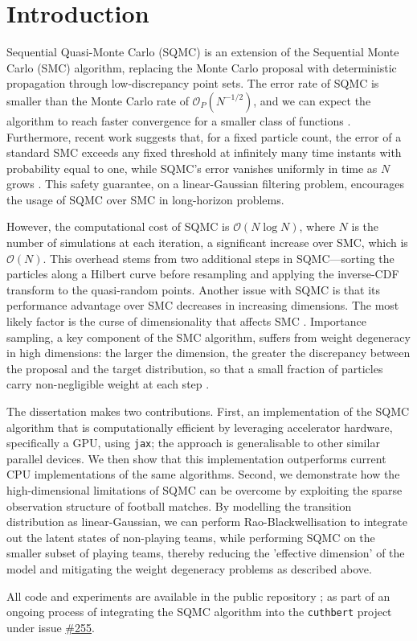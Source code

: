 \chapter{Introduction}

Sequential Quasi-Monte Carlo (SQMC) is an extension of the Sequential Monte Carlo (SMC) algorithm, replacing the Monte Carlo proposal with deterministic propagation through low-discrepancy point sets. The error rate of SQMC is smaller than the Monte Carlo rate of $\mathcal{O}_P (N^{-1/2})$, and we can expect the algorithm to reach faster convergence for a smaller class of functions \citep{chopingerber2015sqmc}. Furthermore, recent work suggests that, for a fixed particle count, the error of a standard SMC exceeds any fixed threshold at infinitely many time instants with probability equal to one, while SQMC's error vanishes uniformly in time as $N$ grows \citep{gerber2026}. This safety guarantee, on a linear-Gaussian filtering problem, encourages the usage of SQMC over SMC in long-horizon problems.

However, the computational cost of SQMC is $\mathcal{O}(N \log N)$, where $N$ is the number of simulations at each iteration, a significant increase over SMC, which is $\mathcal{O}(N)$. This overhead stems from two additional steps in SQMC---sorting the particles along a Hilbert curve before resampling and applying the inverse-CDF transform to the quasi-random points. Another issue with SQMC is that its performance advantage over SMC decreases in increasing dimensions. The most likely factor is the curse of dimensionality that affects SMC \citep{chopingerber2017sqmcintroduction}. Importance sampling, a key component of the SMC algorithm, suffers from weight degeneracy in high dimensions: the larger the dimension, the greater the discrepancy between the proposal and the target distribution, so that a small fraction of particles carry non-negligible weight at each step \citep{snyderbengtssonbickel2008,bickellibengtsson2008}.

The dissertation makes two contributions. First, an implementation of the SQMC algorithm that is computationally efficient by leveraging accelerator hardware, specifically a GPU, using \texttt{jax}; the approach is generalisable to other similar parallel devices. We then show that this implementation outperforms current CPU implementations of the same algorithms. Second, we demonstrate how the high-dimensional limitations of SQMC can be overcome by exploiting the sparse observation structure of football matches. By modelling the transition distribution as linear-Gaussian, we can perform Rao-Blackwellisation to integrate out the latent states of non-playing teams, while performing SQMC on the smaller subset of playing teams, thereby reducing the 'effective dimension' of the model and mitigating the weight degeneracy problems as described above.

All code and experiments are available in the public repository \texttt{}; as part of an ongoing process of integrating the SQMC algorithm into the \texttt{cuthbert} project under issue \href{https://github.com/state-space-models/cuthbert/issues/255}{\#255}.